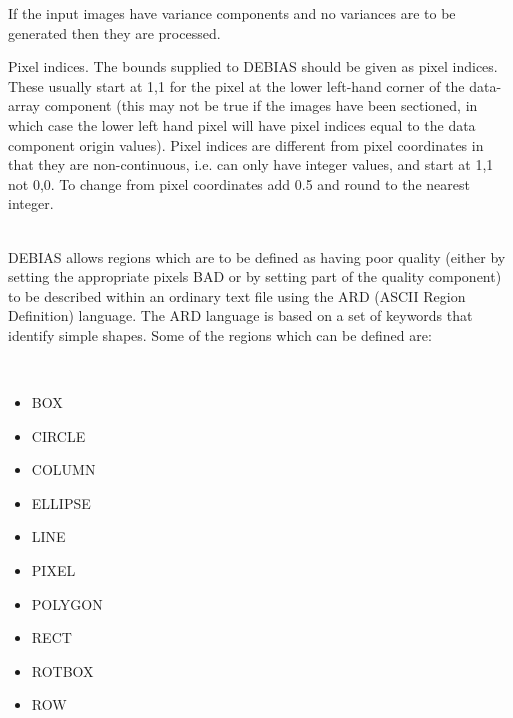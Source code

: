 \documentclass[twoside,11pt]{article}
\renewcommand{\_}{\texttt{\symbol{95}}}
\newcommand{\routine}[1]{{\sc #1}}
\newcommand{\sstdiytopic}[2]{\item[#1:] \mbox{} \\[1.3ex] #2}
\newcommand{\sstitemlist}[1]{
  \mbox{} \\
  \vspace{-3.5ex}
  \begin{itemize}
     #1
  \end{itemize}
}
\newcommand{\sstitem}{\item}
\newcommand{\sstdiytopic}[2]{\item[{#1}] #2 }
\newcommand{\sstitemlist}[1]{
      \begin{itemize}
         #1
      \end{itemize}
      \\
   }
\newcommand{\sstitem}{\item}
\begin{document}
{{{         \sstitem
         If the input images have variance components and no variances
           are to be generated then they are processed.

         \sstitem
         Pixel indices. The bounds supplied to \routine{DEBIAS} should be given as
           pixel indices. These usually start at 1,1 for the pixel at the
           lower left-hand corner of the data-array component (this may
           not be true if the images have been sectioned, in which case the
           lower left hand pixel will have pixel indices equal to the data
           component origin values). Pixel indices are different from
           pixel coordinates in that they are non-continuous, i.e. can
           only have integer values, and start at 1,1 not 0,0. To change
           from pixel coordinates add 0.5 and round to the nearest integer.
      }
   }
   \sstdiytopic{
      ASCII\_region\_definition files
   } {
      \routine{DEBIAS} allows regions which are to be defined as having poor
      quality (either by setting the appropriate pixels BAD or by
      setting part of the quality component) to be described within an
      ordinary text file using the ARD (ASCII Region Definition)
      language. The ARD language is based on a set of keywords that
      identify simple shapes. Some of the regions which can be defined
      are:

      \sstitemlist{

         \sstitem
            BOX

         \sstitem
            CIRCLE

         \sstitem
            COLUMN

         \sstitem
            ELLIPSE

         \sstitem
            LINE

         \sstitem
            PIXEL

         \sstitem
            POLYGON

         \sstitem
            RECT

         \sstitem
            ROTBOX

         \sstitem
            ROW

}}}
\end{document}
